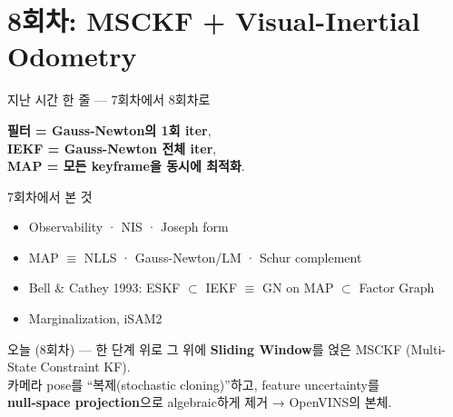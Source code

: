 \section{8회차: MSCKF + Visual-Inertial Odometry}

\begin{frame}{지난 시간 한 줄 — 7회차에서 8회차로}
  \begin{center}\large
    \textbf{필터 = Gauss-Newton의 1회 iter},\\
    \textbf{IEKF = Gauss-Newton 전체 iter},\\
    \textbf{MAP = 모든 keyframe을 동시에 최적화}.
  \end{center}
  \vspace{0.3em}
  \begin{block}{\small 7회차에서 본 것}
    \begin{itemize}
      \item Observability · NIS · Joseph form
      \item MAP $\equiv$ NLLS · Gauss-Newton/LM · Schur complement
      \item \alert{Bell \& Cathey 1993: ESKF $\subset$ IEKF $\equiv$ GN on MAP $\subset$ Factor Graph}
      \item Marginalization, iSAM2
    \end{itemize}
  \end{block}
  \pause
  \begin{exampleblock}{오늘 (8회차) — 한 단계 위로}
    그 위에 \textbf{Sliding Window}를 얹은 \alert{MSCKF (Multi-State Constraint KF)}.\\
    카메라 pose를 ``복제(stochastic cloning)''하고, feature uncertainty를 \\
    \textbf{null-space projection}으로 algebraic하게 제거 → OpenVINS의 본체.
  \end{exampleblock}
\end{frame}


